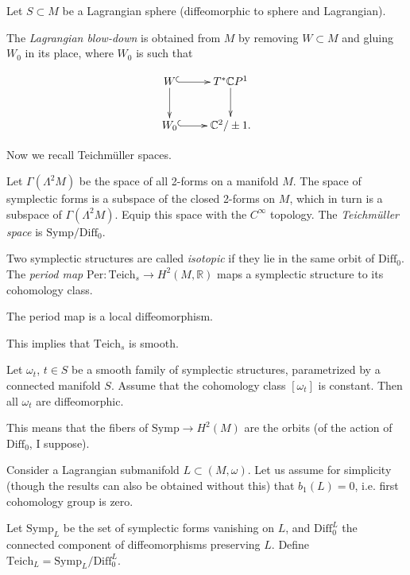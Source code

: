 \noindent
Let $S \subset M$ be a Lagrangian sphere
(diffeomorphic to sphere
and Lagrangian).

\begin{definition}
\label{definition-lagrangian-blow-down}
The {\it Lagrangian blow-down} is obtained
from $M$
by removing $W \subset M$ and gluing $W_0$ in
its place,
where $W_0$ is such that

$$
\xymatrix{
W
\ar@{^{(}->}[r]\ar[d]&T^*\mathbb{C}P^1\ar[d]
\\
W_0\ar@{^{(}->}[r]&\mathbb{C}^2/\pm 1.
}
$$
\end{definition}

\medskip\noindent
Now we recall Teichmüller spaces.

Let $\Gamma(\Lambda^2M)$ be the space of all
2-forms on a manifold $M$.
The space of symplectic forms is a subspace
of the closed 2-forms on $M$,
which in turn is a subspace of
$\Gamma(\Lambda^2M)$.
Equip this space with the $C^\infty$
topology.
The {\it Teichmüller space} is
$\text{Symp}/\text{Diff}_0$.

Two symplectic structures are called {\it
isotopic} if they lie
in the same orbit of $\text{Diff}_0$.
The {\it period map}
$\text{Per}:\text{Teich}_s \to
H^{2}(M,\mathbb{R})$
maps a symplectic structure to its cohomology
class.

\begin{theorem}[Moser, 1965]
\label{theorem-period-map-is-local-diffeo}
The period map is a local diffeomorphism.
\end{theorem}

\noindent
This implies that $\text{Teich}_s$ is smooth.

\begin{theorem}
\label{theorem-mosers-trick}
Let $\omega_t$, $t \in S$ be a smooth family
of symplectic
structures, parametrized by a connected
manifold $S$.
Assume that the cohomology class
$[\omega_t]$ is constant.
Then all $\omega_t$ are diffeomorphic.
\end{theorem}

\noindent
This means that the fibers of $\text{Symp}\to
H^{2}(M)$
are the orbits (of the action of
$\text{Diff}_0$, I suppose).

\medskip\noindent
Consider a Lagrangian submanifold $L \subset
(M,\omega)$.
Let us assume for simplicity (though the
results
can also be obtained without this) that
$b_1(L)=0$,
i.e. first cohomology group is zero.

Let $\text{Symp}_L$ be the set of symplectic
forms vanishing on $L$,
and $\text{Diff}_0^L$ the connected component
of diffeomorphisms
preserving $L$.
Define
$\text{Teich}_L=\text{Symp}_L/\text{Diff}
_0^L$.


